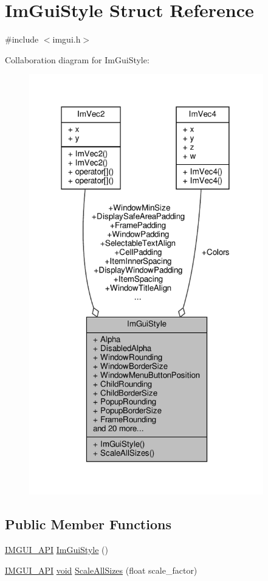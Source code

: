 \hypertarget{structImGuiStyle}{}\section{Im\+Gui\+Style Struct Reference}
\label{structImGuiStyle}


{\ttfamily \#include $<$imgui.\+h$>$}



Collaboration diagram for Im\+Gui\+Style\+:
\nopagebreak
\begin{figure}[H]
\begin{center}
\leavevmode
\includegraphics[width=289pt]{structImGuiStyle__coll__graph}
\end{center}
\end{figure}
\subsection*{Public Member Functions}
\begin{DoxyCompactItemize}
\item 
\hyperlink{imgui_8h_a43829975e84e45d1149597467a14bbf5}{I\+M\+G\+U\+I\+\_\+\+A\+PI} \hyperlink{structImGuiStyle_ab0a3ffb3aeec3e6b09b9bde812b28369}{Im\+Gui\+Style} ()
\item 
\hyperlink{imgui_8h_a43829975e84e45d1149597467a14bbf5}{I\+M\+G\+U\+I\+\_\+\+A\+PI} \hyperlink{imgui__impl__opengl3__loader_8h_ac668e7cffd9e2e9cfee428b9b2f34fa7}{void} \hyperlink{structImGuiStyle_a7c9d3e0974a239f65e433cc952be0627}{Scale\+All\+Sizes} (float scale\+\_\+factor)
\end{DoxyCompactItemize}
